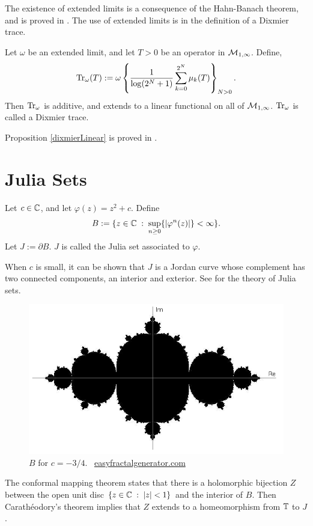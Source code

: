 The existence of extended limits is a consequence of the Hahn-Banach theorem,
and is proved in \cite[Thm 6.2.5]{SingularTraces}. The use
of extended limits is in the definition of a Dixmier trace.

\begin{proposition}
\label{dixmierLinear}
    Let $\omega$ be an extended limit, and let $T > 0$ be an operator
    in $\mathcal{M}_{1,\infty}$. Define,
    \begin{equation}
        \operatorname{Tr}_\omega(T) := \omega\left\{\frac{1}{\log(2^N+1)}\sum_{k=0}^{2^N} \mu_k(T)\right\}_{N > 0}.
    \end{equation}
    Then $\operatorname{Tr}_\omega$ is additive, and extends to a linear functional
    on all of $\mathcal{M}_{1,\infty}$. $\operatorname{Tr}_\omega$ is called a Dixmier trace.
\end{proposition}
Proposition \ref{dixmierLinear} is proved in \cite[Ch. 2]{SingularTraces}.
\section{Julia Sets}
\begin{definition}
    Let $c \in \mathbb{C}$, and let $\varphi(z) = z^2+c$. Define
    \begin{equation}
        B := \{z \in \mathbb{C}\;:\; \sup_{n\geq 0}\{|\varphi^n(z)|\} < \infty\}.
    \end{equation}
    Let $J:= \partial B$. $J$ is called the Julia set associated
    to $\varphi$.
    
    When $c$ is small, it can be shown that $J$ is a Jordan curve
    whose complement has two connected components, an interior and exterior. 
    See \cite{lei2000mandelbrot} for the theory of Julia sets.
\end{definition}
\begin{figure}[h]
    \includegraphics[width=140mm]{Figures/juliaAxes.png}
\caption{$B$ for $c = -3/4$. \textcopyright \, \href{http://www.easyfractalgenerator.com/}{easyfractalgenerator.com}}
\end{figure}
The conformal mapping theorem \cite[Prop. 2.8.1]{berenstein1991complex} states that there is a holomorphic
bijection $Z$ between the open unit disc $\{z \in \mathbb{C}\;:\;|z| < 1\}$
and the interior of $B$. Then Carath\'eodory's theorem \cite[Prop. 2.8.7]{berenstein1991complex}
 implies that $Z$ extends to a homeomorphism from $\mathbb{T}$ to $J$. 

